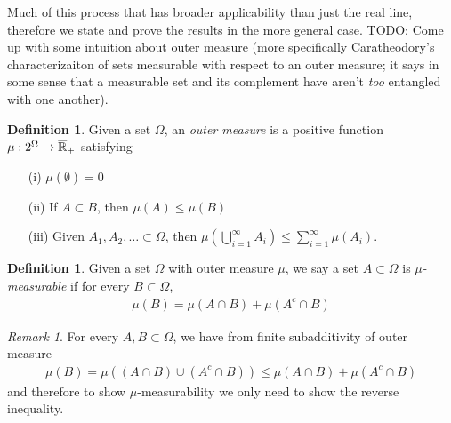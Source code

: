 \documentclass{amsart}
\theoremstyle{remark}
\newtheorem{rem}[thm]{Remark}
\theoremstyle{definition}
\newtheorem{defn}[thm]{Definition}
\begin{document}
Much of this process that has broader applicability than just the real line,  therefore we state and prove the results
in the more general case.
TODO: Come up with some intuition about outer measure (more
specifically Caratheodory's characterizaiton of sets measurable with
respect to an outer measure; it says in some sense that a measurable
set and its complement have aren't \emph{too} entangled with one another).
\begin{defn}Given a set $\Omega$, an \emph{outer measure} is a
positive  function $\mu : 2^\Omega \to \overline{\mathbb{R}}_+$ satisfying
\begin{itemize}
\item[(i)] $\mu(\emptyset) = 0$
\item[(ii)] If $A \subset B$, then $\mu(A) \leq \mu(B)$
\item[(iii)] Given $A_1, A_2, \dots \subset \Omega$, then $\mu \left
    (\bigcup_{i=1}^\infty A_i \right ) \leq \sum_{i=1}^\infty \mu(A_i)$.
\end{itemize}
\end{defn}

\begin{defn}Given a set $\Omega$ with outer measure $\mu$, we say a
  set $A \subset \Omega$ is $\mu$\emph{-measurable} if for every $B
  \subset \Omega$,
\begin{align*}
\mu(B) = \mu(A \cap B) + \mu(A^c \cap B)
\end{align*}
\end{defn}

\begin{rem}For every $A,B \subset \Omega$, we have from finite
  subadditivity of outer measure
\begin{align*}
\mu(B) = \mu((A \cap B) \cup (A^c \cap B)) \leq \mu(A \cap B) + \mu(A^c \cap B)
\end{align*}
and therefore to show $\mu$-measurability we only need to show the
reverse inequality.
\end{rem}
\end{document}
